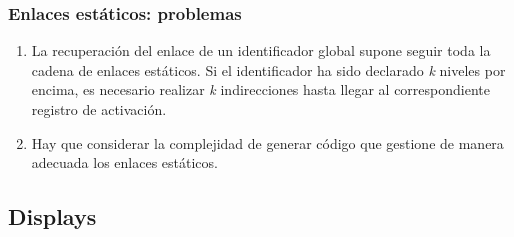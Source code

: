 \documentclass[hyperref={pdfpagelabels=false},tree-dvips]{beamer}
\begin{document}
\begin{frame}[fragile]

\frametitle{Enlaces estáticos: problemas}


\begin{enumerate}%
	\item<2-> La recuperación del enlace de un identificador global supone seguir toda la cadena de enlaces estáticos. Si el identificador ha sido declarado \emph{k} niveles por encima, es necesario realizar \emph{k} indirecciones hasta llegar al correspondiente registro de activación.
	\item<3-> Hay que considerar la complejidad de generar código que gestione de manera adecuada los enlaces estáticos.
\end{enumerate}


\end{frame}
\subsection{Displays}

\begin{frame}[fragile]





\end{frame}
\end{document}
